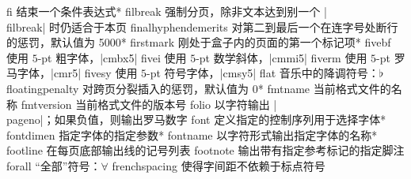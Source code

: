 \capcs fi {结束一个条件表达式}*{\@fi}
\capcs filbreak {强制分页，除非文本达到别一个 |\\filbreak| 时仍适合于本页}{}{}
\capcs finalhyphendemerits {对第二到最后一个在连字号处断行的惩罚，默认值为 5000}*{}
\capcs firstmark {刚处于盒子内的页面的第一个标记项}*{}
\capcs fivebf {使用 $5$-pt 粗字体，|cmbx5|}{}{}
\capcs fivei {使用 $5$-pt 数学斜体，|cmmi5|}{}{}
\capcs fiverm {使用 $5$-pt 罗马字体，|cmr5|}{}{}
\capcs fivesy {使用 $5$-pt 符号字体，|cmsy5|}{}{}
\capcs flat {音乐中的降调符号：$\flat$}{}{}
\capcs floatingpenalty {对跨页分裂插入的惩罚，默认值为 0}*{}
\capcs fmtname {当前格式文件的名称}{}{}
\capcs fmtversion {当前格式文件的版本号}{}{}
\capcs folio {以字符输出 |\\pageno|；如果负值，则输出罗马数字}{}{}
\capcs font {定义指定的控制序列用于选择字体}*{}
\capcs fontdimen {指定字体的指定参数}*{}
\capcs fontname {以字符形式输出指定字体的名称}*{}
\capcs footline {在每页底部输出线的记号列表}{}{}
\capcs footnote {输出带有指定参考标记的指定脚注}{}{}
\capcs forall {“全部”符号：$\forall$}{}{}
\capcs frenchspacing {使得字间距不依赖于标点符号}{}{}
